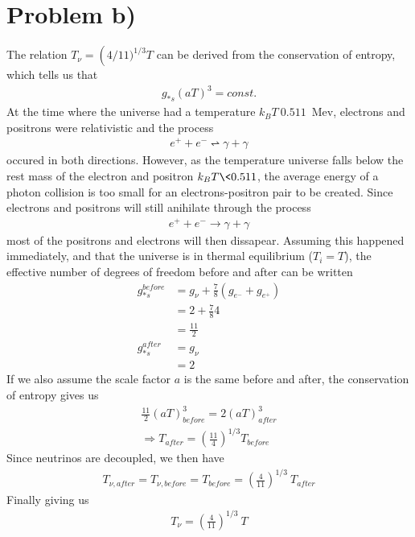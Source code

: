 \documentclass[reprint,english,notitlepage]{revtex4-1}  %
\numberwithin{equation}{section}
\begin{document}
\section{Problem b)}
The relation $T_\nu = \left(4/11)^{1/3} T$ can be derived from the conservation
of entropy, which tells us that
\begin{align}
	g_{*s}(aT)^3 = const.
\end{align}
At the time where the universe had a temperature $k_B T \> 0.511$ Mev, electrons
and positrons were relativistic and the process
\begin{align}
	e^+ + e^- \rightleftharpoon \gamma + \gamma
\end{align}
occured in both directions. However, as the temperature universe falls below the
rest mass of the electron and positron $k_B T \< 0.511$, the average energy of a
photon collision is too small for an electrons-positron pair to be created.
Since electrons and positrons will still anihilate through the process
\begin{align}
	e^+ + e^- \rightarrow \gamma + \gamma
\end{align}
most of the positrons and electrons will then dissapear. Assuming this happened
immediately, and that the universe is in thermal equilibrium ($T_i=T$), the
effective number of degrees of freedom before and after can be written
\begin{align}
	g_{*s}^{before} &= g_\nu + \frac{7}{8}(g_{e^-} + g_{e^+}) \\
									&= 2 + \frac{7}{8}4 \\
									&= \frac{11}{2} \\
	g_{*s}^{after} &= g_\nu \\
								 &= 2
\end{align}
If we also assume the scale factor $a$ is the same before and after, the
conservation of entropy gives us
\begin{align}
	\frac{11}{2}(aT)_{before}^3 = 2(aT)_{after}^3 \\
	\Rightarrow T_{after} = (\frac{11}{4})^{1/3} T_{before}
\end{align}
Since neutrinos are decoupled, we then have
\begin{align}
	T_{\nu,after} = T_{\nu,before} = T_{before} = \left(\frac{4}{11}\right)^{1/3} \ T_{after}
\end{align}
Finally giving us
\begin{align}
	T_\nu = \left(\frac{4}{11}\right)^{1/3} \ T
\end{align}
\end{document}
